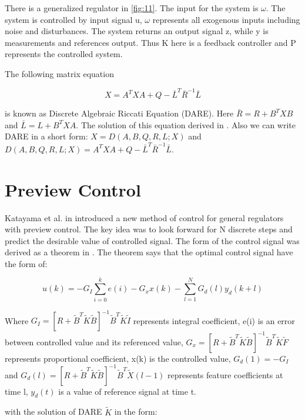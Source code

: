 \documentclass[12pt,a4paper]{report}
\begin{document}
			There is a generalized regulator in \cref{fig:11}. The input for the system is $\omega$. The system is controlled by input signal u, $\omega$ represents all exogenous inputs including noise and disturbances. The system returns an output signal z, while y is measurements and references output. Thus K here is a feedback controller and P represents the controlled system.
			
			The following matrix equation
			
			\begin{equation}\label{eq:oc6}
				X = A^{T}XA + Q - \bar{L}^{T} \bar{R}^{-1} \bar{L}
			\end{equation}
			
			is known as Discrete Algebraic Riccati Equation (DARE). Here $\bar{R} = R + B^{T}XB$ and $\bar{L} = L + B^{T}XA$. The solution of this equation derived in \cite{hazell2008discrete}. Also we can write DARE in a short form: $X = D(A,B,Q,R,L;X)$ and $D(A,B,Q,R,L;X) = A^{T} XA + Q -  \bar{L}^{T} \bar{R}^{-1} \bar{L}$.
		
		\section{Preview Control} 
			Katayama et al. in \cite{katayama1985design} introduced a new method of control for general regulators with preview control. The key idea was to look forward for N discrete steps and predict the desirable value of controlled signal. The form of the control signal was derived as a theorem in \cite{katayama1985design}. The theorem says that the optimal control signal have the form of:
			
			\begin{equation}\label{eq:pc1}
				u(k) = -G_I \sum^{k}_{i=0} e(i) - G_xx(k) - \sum^{N}_{l=1}G_d(l)y_d(k+l)
			\end{equation}
			
			Where $G_I = [R+\tilde{B}^T \tilde{K} \tilde{B}]^{-1} \tilde{B}^T \tilde{K} \tilde{I}$ represents integral coefficient, e(i) is an error between controlled value and its referenced value, $G_x = [R+\tilde{B}^T \tilde{K} \tilde{B}]^{-1} \tilde{B}^T \tilde{K} \tilde{F}$ represents proportional coefficient, x(k) is the controlled value, $G_d(1) = -G_I$ and $G_d(l) = [R+\tilde{B}^T \tilde{K} \tilde{B}]^{-1} \tilde{B}^T \tilde{X}(l-1)$ represents feature coefficients at time l, $y_d(t)$ is a value of reference signal at time t.
			
			with the solution of DARE $\tilde{K}$ in the form:
			
\end{document}
